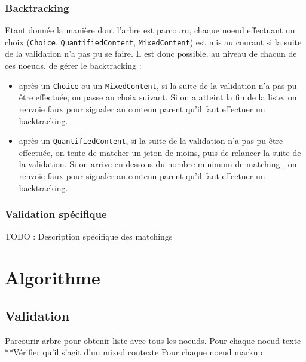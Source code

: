 \documentclass[12pt]{article}
\newcommand{\kw}[1]{\texttt{#1}}
\newcommand{\TODO}[1]{{\huge TODO : #1}}
\begin{document}
\subsubsection{Backtracking}
Etant donnée la manière dont l'arbre est parcouru, chaque noeud effectuant un choix (\kw{Choice}, \kw{QuantifiedContent}, \kw{MixedContent}) est mis au courant si la suite de la validation n'a pas pu se faire. Il est donc possible, au niveau de chacun de ces noeuds, de gérer le backtracking :
\begin{itemize}
\item après un \kw{Choice} ou un \kw{MixedContent}, si la suite de la validation n'a pas pu être effectuée, on passe au choix suivant. Si on a atteint la fin de la liste, on renvoie faux pour signaler au contenu parent qu'il faut effectuer un backtracking.
\item après un \kw{QuantifiedContent}, si la suite de la validation n'a pas pu être effectuée, on tente de \og matcher \fg un jeton de moins, puis de relancer la suite de la validation. Si on arrive en dessous du nombre minimum de \og matching \fg, on renvoie faux pour signaler au contenu parent qu'il faut effectuer un backtracking.
\end{itemize}
\subsubsection{Validation spécifique}
\TODO{Description spécifique des matchings}
\newpage
\section{Algorithme}
\subsection{Validation}
Parcourir arbre pour obtenir liste avec tous les noeuds.
Pour chaque noeud texte
**Vérifier qu’il s’agit d’un mixed contexte
Pour chaque noeud markup
\end{document}
